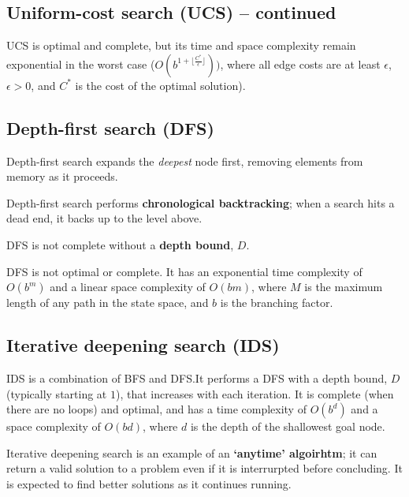 
\subsection{Uniform-cost search (UCS) -- continued}
\label{sub_sec:uniform_cost_search_continued}

UCS is optimal and complete, but its time and space complexity remain exponential in the worst case ($O(b^{1 + \lfloor \frac{C^{*}}{\epsilon} \rfloor}))$, where all edge costs are at least $\epsilon$, $\epsilon > 0$, and $C^{*}$ is the cost of the optimal solution).

\subsection{Depth-first search (DFS)}
\label{sub_sec:depth_first_search}

Depth-first search expands the \emph{deepest} node first, removing elements from memory as it proceeds.

\begin{definition}
    Depth-first search performs \textbf{chronological backtracking}; when a search hits a dead end, it backs up to the level above.
\end{definition}

\begin{definition}
    DFS is not complete without a \textbf{depth bound}, $D$.
\end{definition}

DFS is not optimal or complete. It has an exponential time complexity of $O(b^{m})$ and a linear space complexity of $O(bm)$, where $M$ is the maximum length of any path in the state space, and $b$ is the branching factor.

\subsection{Iterative deepening search (IDS)}
\label{sub_sec:iterative_deepening_search}

IDS is a combination of BFS and DFS.\@ It performs a DFS with a depth bound, $D$ (typically starting at $1$), that increases with each iteration. It is complete (when there are no loops) and optimal, and has a time complexity of $O(b^{d})$ and a space complexity of $O(bd)$, where $d$ is the depth of the shallowest goal node.

\begin{definition}
    Iterative deepening search is an example of an \textbf{`anytime' algoirhtm}; it can return a valid solution to a problem even if it is interrurpted before concluding. It is expected to find better solutions as it continues running.
\end{definition}

